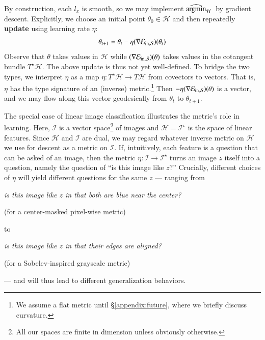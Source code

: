 \documentclass[openany, notitlepage, justified]{tufte-book}
\theoremstyle{plain}
\theoremstyle{definition}
\newcommand{\Hh}{\mathcal{H}}
\newcommand{\Ii}{\mathcal{I}}
\begin{document}
        By construction, each $l_x$ is smooth, so we may implement $\optH$ by
        gradient descent.  Explicitly, we choose an initial point $\theta_0\in \Hh$
        and then repeatedly \textbf{update} using learning rate $\eta$:
        $$
            \theta_{t+1} = \theta_t - \eta (\nabla \mathcal{E}_{\text{in},\mathcal{S}})(\theta_t) 
        $$
        Observe that $\theta$ takes values in $\Hh$ while $(\nabla \mathcal{E}_{\text{in},\mathcal{S}})(\theta)$ takes
        values in the cotangent bundle $T^\star\Hh$.  The above update is
        thus not yet well-defined.  To bridge the two types, we
        interpret $\eta$ as a map $\eta: T^\star\Hh\to T\Hh$ from
        covectors to vectors.  That is, $\eta$ has the type signature
        of an (inverse) metric.\footnote{
            We assume a flat metric until \S\ref{appendix:future}, where we
            briefly discuss curvature.
        } Then $-\eta (\nabla \mathcal{E}_{\text{in},\mathcal{S}})(\theta)$ is a vector, and we may flow along this
        vector geodesically from $\theta_t$ to $\theta_{t+1}$. 

        The special case of linear image classification illustrates the
        metric's role in learning.  Here, $\Ii$ is a 
        vector space\footnote{
            All our spaces are finite in dimension unless
            obviously otherwise.
        } of images and $\Hh = \Ii^\star$ is the space of linear features.
        Since $\Hh$ and $\Ii$ are dual, we may regard whatever inverse metric
        on $\Hh$ we use for descent as a metric on $\Ii$.  If, intuitively,
        each feature is a question that can be asked of an image, then the
        metric $\eta:\Ii\to\Ii^\star$ turns an image $z$ itself into a
        question, namely the question of ``is this image like $z$?''  Crucially,
        different choices of $\eta$ will yield different questions for the same
        $z$ ---
        ranging from

        \centerline{
            \emph{is this image like $z$ in that both are blue near the center?}
        }\par\centerline{
            (for a center-masked pixel-wise metric)
        }

        \noindent
        to

        \centerline{
            \emph{is this image like $z$ in that their edges are aligned?}
        }\par\centerline{
            (for a Sobelev-inspired grayscale metric)
        }

        \noindent
        --- and will thus lead to different generalization behaviors. 
\end{document}
